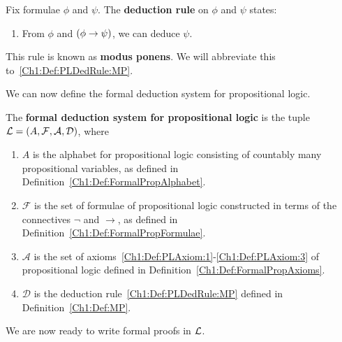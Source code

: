\begin{boxdefinition}\label{Ch1:Def:MP}
    Fix formulae $\phi$ and $\psi$. The \textbf{deduction rule} on $\phi$ and $\psi$ states:
    \begin{enumerate}[label = (MP)]
        \item\label{Ch1:Def:PLDedRule:MP}
        \begin{center}
            From $\phi$ and $\left( \phi \to \psi \right)$, we can deduce $\psi$.
        \end{center}
    \end{enumerate}
    This rule is known as \textbf{modus ponens}. We will abbreviate this to~\ref{Ch1:Def:PLDedRule:MP}.
\end{boxdefinition}

We can now define the formal deduction system for propositional logic.

\begin{boxdefinition}
    The \textbf{formal deduction system for propositional logic} is the tuple $\mathcal{L} = \left( A, \mathcal{F}, \mathcal{A}, \mathcal{D} \right)$, where
    \begin{enumerate}
        \item $A$ is the alphabet for propositional logic consisting of countably many propositional variables, as defined in Definition~\ref{Ch1:Def:FormalPropAlphabet}.

        \item $\mathcal{F}$ is the set of formulae of propositional logic constructed in terms of the connectives $\neg$ and $\to$, as defined in Definition~\ref{Ch1:Def:FormalPropFormulae}.
        
        \item $\mathcal{A}$ is the set of axioms~\ref{Ch1:Def:PLAxiom:1}-\ref{Ch1:Def:PLAxiom:3} of propositional logic defined in Definition~\ref{Ch1:Def:FormalPropAxioms}.
        
        \item $\mathcal{D}$ is the deduction rule~\ref{Ch1:Def:PLDedRule:MP} defined in Definition~\ref{Ch1:Def:MP}.
    \end{enumerate}
\end{boxdefinition}

We are now ready to write formal proofs in $\mathcal{L}$.

